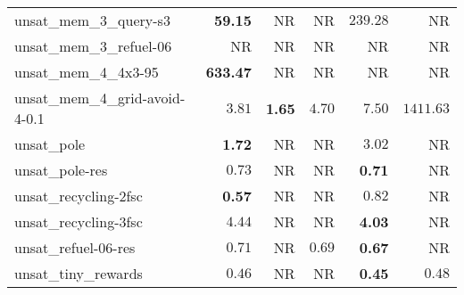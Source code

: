 \begin{tabular}{lrrrrr}
unsat\_mem\_3\_query-s3 & \textbf{59.15} & NR & NR & $239.28$ & NR \\
unsat\_mem\_3\_refuel-06 & NR & NR & NR & NR & NR \\
unsat\_mem\_4\_4x3-95 & \textbf{633.47} & NR & NR & NR & NR \\
unsat\_mem\_4\_grid-avoid-4-0.1 & $3.81$ & \textbf{1.65} & $4.70$ & $7.50$ & $1411.63$ \\
unsat\_pole & \textbf{1.72} & NR & NR & $3.02$ & NR \\
unsat\_pole-res & $0.73$ & NR & NR & \textbf{0.71} & NR \\
unsat\_recycling-2fsc & \textbf{0.57} & NR & NR & $0.82$ & NR \\
unsat\_recycling-3fsc & $4.44$ & NR & NR & \textbf{4.03} & NR \\
unsat\_refuel-06-res & $0.71$ & NR & $0.69$ & \textbf{0.67} & NR \\
unsat\_tiny\_rewards & $0.46$ & NR & NR & \textbf{0.45} & $0.48$ \\
\bottomrule
\end{tabular}
